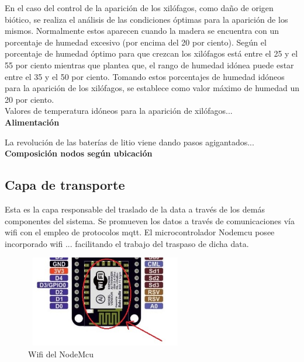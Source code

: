     En el caso del control de la aparición de los xilófagos, como daño de origen biótico, se realiza el análisis de las condiciones óptimas para la aparición de los mismos. Normalmente estos aparecen cuando la madera se encuentra con un porcentaje de humedad excesivo (por encima del 20 por ciento). Según \cite{monitoringMoisture} \cite{rodriguezcodigo} el porcentaje de humedad óptimo para que crezcan los xilófagos está entre el 25 y el 55 por ciento mientras que \cite{woodPreservation} plantea que, el rango de humedad idónea puede estar entre el 35 y el 50 por ciento. Tomando estos porcentajes de humedad idóneos para la aparición de los xilófagos, se establece como valor máximo de humedad un 20 por ciento.\\

    Valores de temperatura idóneos para la aparición de xilófagos...\\

    \textbf{Alimentación}

    La revolución de las baterías de litio viene dando pasos agigantados...\\ 

    \textbf{Composición nodos según ubicación}

    \subsection{Capa de transporte}\label{subsec:capa_transporte}

    Esta es la capa responsable del traslado de la data a través de los demás componentes del sistema. Se promueven los datos a través de comunicaciones vía wifi con el empleo de protocolos mqtt. El microcontrolador Nodemcu posee incorporado wifi ... facilitando el trabajo del traspaso de dicha data.\\

    \begin{figure}[h]
        \centering
        \includegraphics[width=7cm, height=4cm]{imagenes/wifi_nodemcu.jpg}
        \caption{Wifi del NodeMcu}
        \label{imag:wifi_nodemcu}
    \end{figure}

